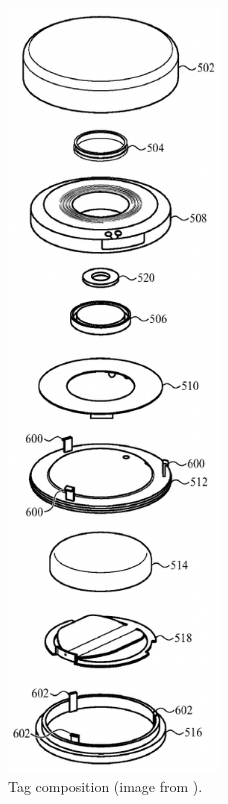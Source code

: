 \documentclass[english]{article}
\begin{document}
\begin{figure}[]
	\centering
	\includegraphics[width=0.5\textwidth]{images/br1 struttura.png}
	\caption{Tag composition (image from \cite{Perkins_Sano_Walton_Wang_Werner_Ashcroft_De_Hunter_Kim_Crosby_Jung_Schaevitz_Avendal_Da_Di_Nath_Papantonis_Graham_Thompson_Copeland_Ely_2022}). }
	\label{img:br1}
\end{figure}
\end{document}
